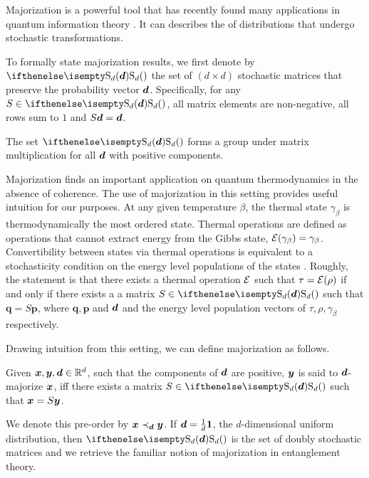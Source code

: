 Majorization is a powerful tool that has recently found many applications in quantum information theory .
It can describes the  of distributions that undergo stochastic transformations.

To formally state majorization results, we first denote by $\stoch$ the set of $(d \times d)$ stochastic matrices that preserve the probability vector $\bm{d}$. 
Specifically, for any $S \in \stoch$, all matrix elements are non-negative, all rows sum to $1$ and $S\bm{d} = \bm{d}$.

The set $\stoch$ forms a group under matrix multiplication for all $\bm{d}$ with positive components.

Majorization finds an important application on quantum thermodynamics in the absence of coherence.
The use of majorization in this setting provides useful intuition for our purposes.
At any given temperature $\beta$, the thermal state $\gamma_\beta$ is thermodynamically the most ordered state. 
Thermal operations are defined as operations that cannot extract energy from the Gibbs state, $\mathcal{E}(\gamma_\beta) = \gamma_\beta$.
Convertibility between states via thermal operations is equivalent to a stochasticity condition on the energy level populations of the states .
Roughly, the statement is that there exists a thermal operation $\mathcal{E}$ such that $\tau = \mathcal{E}(\rho)$ if and only if there exists a a matrix $S \in \stoch$ such that $\bm{q} = S\bm{p}$, where $\bm{q}, \bm{p}$ and $\bm{d}$ and the energy level population vectors of $\tau, \rho, \gamma_\beta$ respectively.

Drawing intuition from this setting, we can define majorization as follows.
\begin{definition}\label{def:dmajor}
    Given $\bm{x}, \bm{y}, \bm{d} \in \mathbb{R}^d$, such that the components of $\bm{d}$ are positive, $\bm{y}$ is said to $\bm{d}$-majorize $\bm{x}$, iff there exists a matrix $S \in \stoch$ such that $\bm{x} = S\bm{y}$.
\end{definition}
We denote this pre-order by $\bm{x} \prec_{\bm{d}} \bm{y}$.
If $\bm{d} = \frac{1}{d}\bm{1}$, the $d$-dimensional uniform distribution, then $\stoch$ is the set of doubly stochastic matrices and we retrieve the familiar notion of majorization in entanglement theory. 

